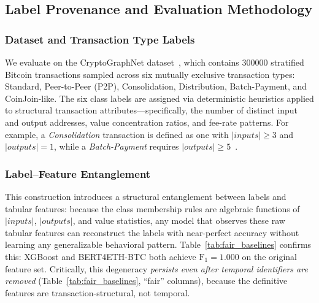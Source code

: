 %


\subsection{Label Provenance and Evaluation Methodology}
\label{subsec:label_provenance}

\subsubsection{Dataset and Transaction Type Labels}
We evaluate on the CryptoGraphNet dataset~\cite{cryptographnet2024}, which contains
\num{300000} stratified Bitcoin transactions sampled across six mutually exclusive
transaction types: Standard, Peer-to-Peer (P2P), Consolidation, Distribution,
Batch-Payment, and CoinJoin-like.
The six class labels are assigned via deterministic heuristics applied to
structural transaction attributes---specifically, the number of distinct input
and output addresses, value concentration ratios, and fee-rate patterns.
For example, a \emph{Consolidation} transaction is defined as one with
$|\mathit{inputs}| \geq 3$ and $|\mathit{outputs}| = 1$, while a
\emph{Batch-Payment} requires $|\mathit{outputs}| \geq 5$~\cite{cryptographnet2024}.

\subsubsection{Label--Feature Entanglement}
This construction introduces a structural entanglement between labels and tabular
features: because the class membership rules are algebraic functions of
$|\mathit{inputs}|$, $|\mathit{outputs}|$, and value statistics, any model
that observes these raw tabular features can reconstruct the labels
with near-perfect accuracy without learning any generalizable behavioral
pattern.
Table~\ref{tab:fair_baselines} confirms this: XGBoost and
BERT4ETH-BTC both achieve $\text{F}_1 = 1.000$ on the original feature set.
Critically, this degeneracy \emph{persists even after temporal identifiers
are removed} (Table~\ref{tab:fair_baselines}, ``fair'' columns), because
the definitive features are transaction-structural, not temporal.

